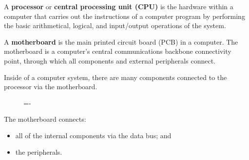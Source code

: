 \documentclass[a4paper]{systems-software}
\begin{document}
A \textbf{processor} or \textbf{central processing unit (CPU)} is the hardware within a computer that carries out the instructions of a computer program by performing the basic arithmetical, logical, and input/output operations of the system.

A \textbf{motherboard} is the main printed circuit board (PCB) in a computer. The motherboard is a computer's central communications backbone connectivity point, through which all components and external peripherals connect.

Inside of a computer system, there are many components connected to the processor via the motherboard.

\begin{figure}[H]
  \lineskip=-\fboxrule
\end{figure}

The motherboard connects:
\begin{itemize}
	\item all of the internal components via the data bus; and
	\item the peripherals.
\end{itemize}
\end{document}
